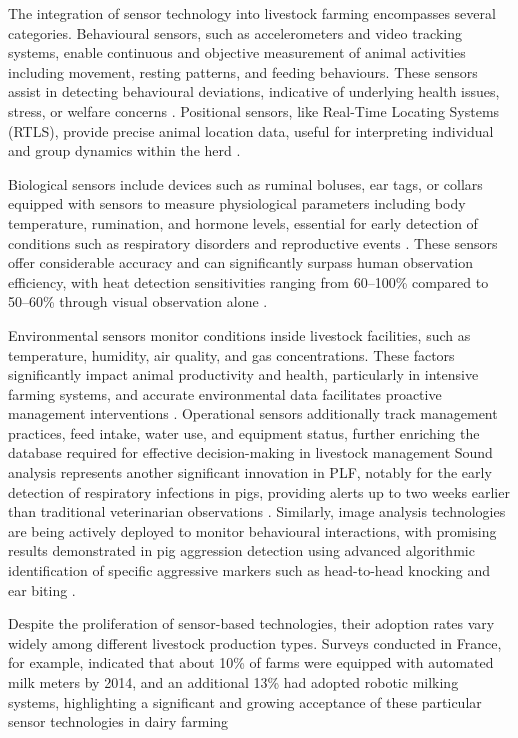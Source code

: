 The integration of sensor technology into livestock farming encompasses several categories. Behavioural sensors, such as accelerometers and video tracking systems, enable continuous and objective measurement of animal activities including movement, resting patterns, and feeding behaviours. These sensors assist in detecting behavioural deviations, indicative of underlying health issues, stress, or welfare concerns \cite{aydin2010application, viazzi2014image, chen2017image}. Positional sensors, like Real-Time Locating Systems (RTLS), provide precise animal location data, useful for interpreting individual and group dynamics within the herd \cite{wagner2020machine}.

Biological sensors include devices such as ruminal boluses, ear tags, or collars equipped with sensors to measure physiological parameters including body temperature, rumination, and hormone levels, essential for early detection of conditions such as respiratory disorders and reproductive events \cite{MOTTRAM20161575, SAINTDIZIER201853}. These sensors offer considerable accuracy and can significantly surpass human observation efficiency, with heat detection sensitivities ranging from 60–100\% compared to 50–60\% through visual observation alone \cite{SAINTDIZIER201853}.

Environmental sensors monitor conditions inside livestock facilities, such as temperature, humidity, air quality, and gas concentrations. These factors significantly impact animal productivity and health, particularly in intensive farming systems, and accurate environmental data facilitates proactive management interventions \cite{FROST200493, halachmi2019smart}. Operational sensors additionally track management practices, feed intake, water use, and equipment status, further enriching the database required for effective decision-making in livestock management \cite{kashiha2013automatic, ANDERSEN20141881} Sound analysis represents another significant innovation in PLF, notably for the early detection of respiratory infections in pigs, providing alerts up to two weeks earlier than traditional veterinarian observations \cite{VANHIRTUM2003677, Vandermeulen2015}. Similarly, image analysis technologies are being actively deployed to monitor behavioural interactions, with promising results demonstrated in pig aggression detection using advanced algorithmic identification of specific aggressive markers such as head-to-head knocking and ear biting \cite{viazzi2014image}.

Despite the proliferation of sensor-based technologies, their adoption rates vary widely among different livestock production types. Surveys conducted in France, for example, indicated that about 10\% of farms were equipped with automated milk meters by 2014, and an additional 13\% had adopted robotic milking systems, highlighting a significant and growing acceptance of these particular sensor technologies in dairy farming \cite{allain2015connectivite}

